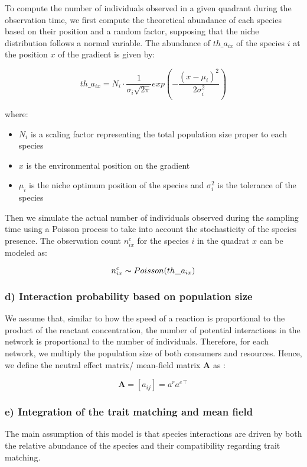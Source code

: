To compute the number of individuals observed in a given quadrant during the observation time, we first compute the theoretical abundance of each species based on their position and a random factor, supposing that the niche distribution follows a normal variable.
The abundance of $th\_a_{ix}$ of the species $i$ at the position $x$ of the gradient is given by:

$$
    th\_a_{ix} = N_i \cdot \frac{1}{\sigma_i\sqrt{2\pi}} exp \left( -\frac{(x-\mu_i)^2}{2\sigma_i^2} \right)
$$

where:
\begin{itemize}
    \item $N_i$ is a scaling factor representing the total population size proper to each species
    \item $x$ is the environmental position on the gradient
    \item $\mu_i$ is the niche optimum position of the species and $\sigma_i^2$ is the tolerance of the species
\end{itemize}

Then we simulate the actual number of individuals observed during the sampling time using a Poisson process to take into account the stochasticity of the species presence. The observation count $n_{ix}^c$ for the species $i$ in the quadrat $x$ can be modeled as:

$$
    n_{ix}^c \thicksim Poisson(th\_a_{ix})
$$

\subsubsection{d) Interaction probability based on population size}

We assume that, similar to how the speed of a reaction is proportional to the product of the reactant concentration, the number of potential interactions in the network is proportional to the number of individuals. Therefore, for each network, we multiply the population size of both consumers and resources. 
Hence, we define the neutral effect matrix/ mean-field matrix $\mathbf{A}$ as : 

$$
    \mathbf{A} = [a_{ij}] = a^r a^{c\intercal}
$$

\subsubsection{e) Integration of the trait matching and mean field}

The main assumption of this model is that species interactions are driven by both the relative abundance of the species and their compatibility regarding trait matching.

